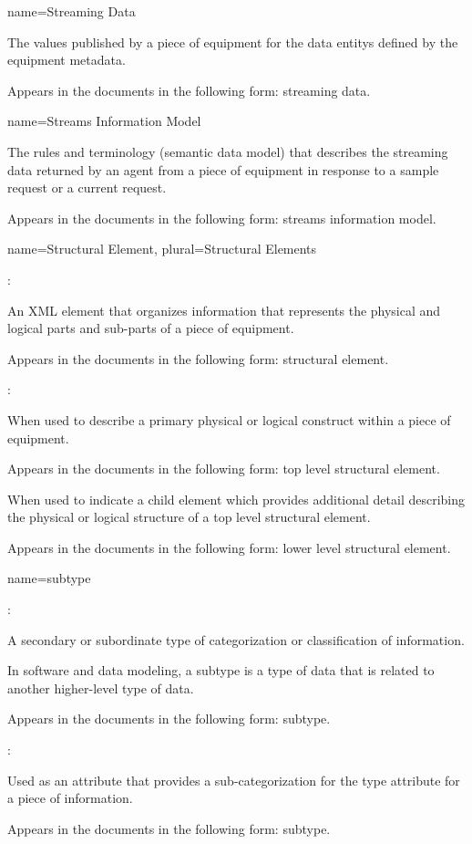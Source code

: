 {
  name={Streaming Data}
}
{
	The values published by a piece of equipment for the \glspl{data entity} defined by the \gls{equipment metadata}.

	Appears in the documents in the following form: \gls{streaming data}.
}


{
  name={Streams Information Model}
}
{
	The rules and terminology (\gls{semantic data model}) that describes the \gls{streaming data} returned by an \gls{agent} from a piece of equipment in response to a \gls{sample request} or a \gls{current request}.

	Appears in the documents in the following form: \gls{streams information model}.
}


{
  name={Structural Element},
  plural={Structural Elements}
}
{
	:

	An XML element that organizes information that represents the physical and logical parts and sub-parts of a piece of equipment.

	Appears in the documents in the following form: \gls{structural element}.

	:

	When used to describe a primary physical or logical construct within a piece of equipment. 

	Appears in the documents in the following form: \gls{top level} \gls{structural element}.

	When used to indicate a \gls{child element} which provides additional detail describing the physical or logical structure of a \gls{top level} \gls{structural element}.

	Appears in the documents in the following form: \gls{lower level} \gls{structural element}.
}


{
  name={subtype}
}
{
	:

	A secondary or subordinate type of categorization or classification of information.

	In software and data modeling, a subtype is a type of data that is related to another higher-level type of data.

	Appears in the documents in the following form: subtype.

	:

	Used as an attribute that provides a sub-categorization for the \gls{type} attribute for a piece of information.

	Appears in the documents in the following form: \gls{subtype}.
}



